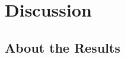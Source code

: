 \documentclass[letterpaper,11pt]{article}
\begin{document}
\newpage
\pagecolor{resblack}
\begin{figure}[H]
  \vspace*{-1.75cm}
  \caption{}
  \label{figure:lstm_res}
\end{figure}
\thispagestyle{empty}


\newpage
\pagecolor{white}
\section{Discussion}

\subsection{About the Results}
\end{document}
